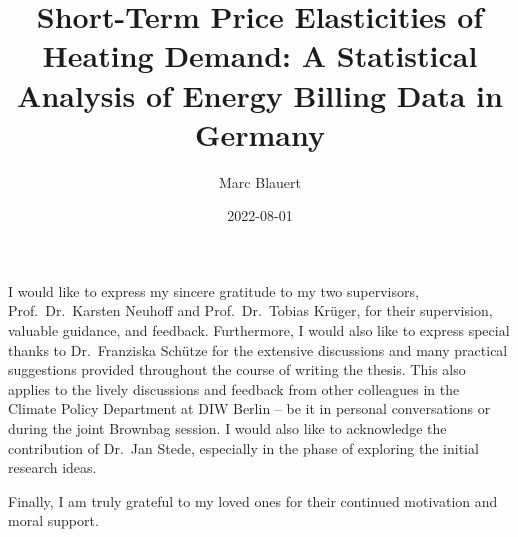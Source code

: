 \documentclass[12pt,twoside]{reedthesis}
\title{Short-Term Price Elasticities of Heating Demand: A Statistical Analysis of Energy Billing Data in Germany}
\author{Marc Blauert}
\date{2022-08-01}
\begin{document}
  \maketitle

\frontmatter %
\pagestyle{empty} %
  \begin{acknowledgements}
    I would like to express my sincere gratitude to my two supervisors, Prof.~Dr.~Karsten Neuhoff and Prof.~Dr.~Tobias Krüger, for their supervision, valuable guidance, and feedback. Furthermore, I would also like to express special thanks to Dr.~Franziska Schütze for the extensive discussions and many practical suggestions provided throughout the course of writing the thesis. This also applies to the lively discussions and feedback from other colleagues in the Climate Policy Department at DIW Berlin -- be it in personal conversations or during the joint Brownbag session. I would also like to acknowledge the contribution of Dr.~Jan Stede, especially in the phase of exploring the initial research ideas.

    \par

    Finally, I am truly grateful to my loved ones for their continued motivation and moral support.

    \par
  \end{acknowledgements}

  \hypersetup{linkcolor=black}
  \setcounter{secnumdepth}{2}
  \setcounter{tocdepth}{2}
  \tableofcontents

  \listoftables
\end{document}
